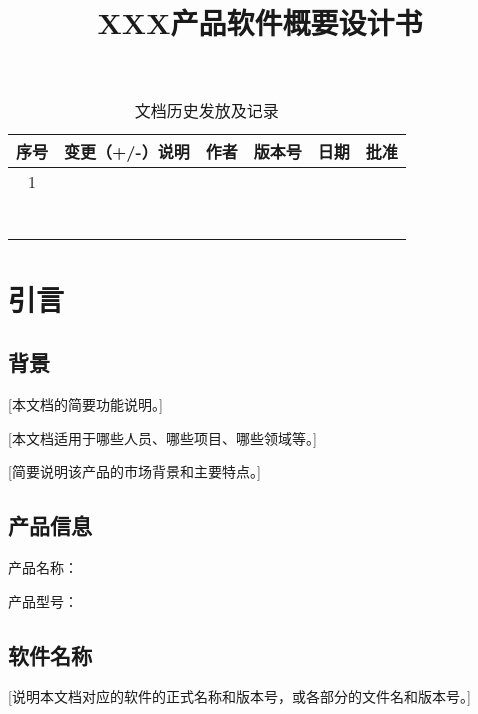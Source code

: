 \documentclass[10pt,a4paper,titlepage]{article} %
\title{XXX产品软件概要设计书}
\author{}
\date{}
\begin{document}
\maketitle
\clearpage

\pagestyle{fancy}   %
\rhead{\today}
\setcounter{page}{1}
\renewcommand{\thetable}{}
\renewcommand{\captionfont}{\Large}
\begin{table}[h]
\Large   
\caption{文档历史发放及记录}  
\begin{center}  
\begin{tabular}{|c|p{4.5cm}<{\centering}|c|c|c|c|}  
\hline  
序号 & 变更（+/-）说明 & 作者 & 版本号 & 日期 & 批准 \\ \hline  
1 &  &  &  &  &  \\ \hline
  &  &  &  &  &  \\ \hline
  &  &  &  &  &  \\ \hline
  &  &  &  &  &  \\ \hline
  &  &  &  &  &  \\ \hline 
  &  &  &  &  &  \\ \hline
  &  &  &  &  &  \\ \hline
  &  &  &  &  &  \\ \hline 

\end{tabular}  
\end{center}  
\end{table} 
\clearpage
\tableofcontents  %
\clearpage
\setcounter{page}{1}
\section{引言}
\subsection{背景}
[本文档的简要功能说明。]

[本文档适用于哪些人员、哪些项目、哪些领域等。]

[简要说明该产品的市场背景和主要特点。]
\subsection{产品信息}
产品名称：

产品型号：

\subsection{软件名称}
[说明本文档对应的软件的正式名称和版本号，或各部分的文件名和版本号。]\newline
\end{document}
